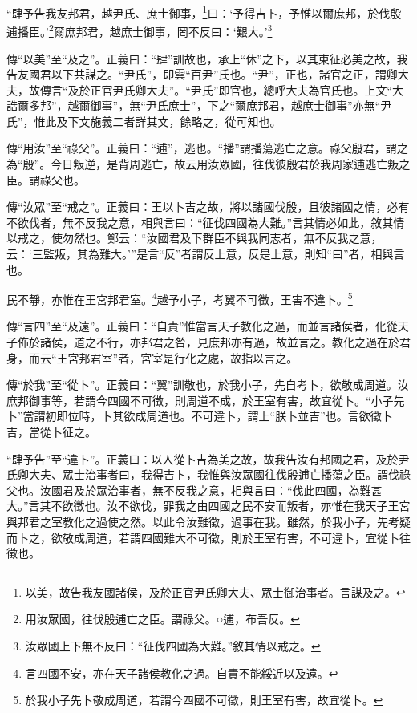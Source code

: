 “肆予告我友邦君，越尹氏、庶士御事，\footnote{以美，故告我友國諸侯，及於正官尹氏卿大夫、眾士御治事者。言謀及之。}曰：‘予得吉卜，予惟以爾庶邦，於伐殷逋播臣。’\footnote{用汝眾國，往伐殷逋亡之臣。謂祿父。○逋，布吾反。}爾庶邦君，越庶士御事，罔不反曰：‘艱大。’\footnote{汝眾國上下無不反曰：“征伐四國為大難。”敘其情以戒之。}


{\noindent\zhuan{}\fzbyks 傳“以美”至“及之”。正義曰：“肆”訓故也，承上“休”之下，以其東征必美之故，我告友國君以下共謀之。“尹氏”，即雲“百尹”氏也。“尹”，正也，諸官之正，謂卿大夫，故傳言“及於正官尹氏卿大夫”。“尹氏”即官也，總呼大夫為官氏也。上文“大誥爾多邦”，越爾御事”，無“尹氏庶士”，下之“爾庶邦君，越庶士御事”亦無“尹氏”，惟此及下文施義二者詳其文，餘略之，從可知也。 \par}

{\noindent\zhuan{}\fzbyks 傳“用汝”至“祿父”。正義曰：“逋”，逃也。“播”謂播蕩逃亡之意。祿父殷君，謂之為“殷”。今日叛逆，是背周逃亡，故云用汝眾國，往伐彼殷君於我周家逋逃亡叛之臣。謂祿父也。 \par}

{\noindent\zhuan{}\fzbyks 傳“汝眾”至“戒之”。正義曰：王以卜吉之故，將以諸國伐殷，且彼諸國之情，必有不欲伐者，無不反我之意，相與言曰：“征伐四國為大難。”言其情必如此，敘其情以戒之，使勿然也。鄭云：“汝國君及下群臣不與我同志者，無不反我之意，云：‘三監叛，其為難大。’”是言“反”者謂反上意，反是上意，則知“曰”者，相與言也。 \par}

民不靜，亦惟在王宮邦君室。\footnote{言四國不安，亦在天子諸侯教化之過。自責不能綏近以及遠。}越予小子，考翼不可徵，王害不違卜。\footnote{於我小子先卜敬成周道，若謂今四國不可徵，則王室有害，故宜從卜。}

{\noindent\zhuan{}\fzbyks 傳“言四”至“及遠”。正義曰：“自責”惟當言天子教化之過，而並言諸侯者，化從天子佈於諸侯，道之不行，亦邦君之咎，見庶邦亦有過，故並言之。教化之過在於君身，而云“王宮邦君室”者，宮室是行化之處，故指以言之。 \par}

{\noindent\zhuan{}\fzbyks 傳“於我”至“從卜”。正義曰：“翼”訓敬也，於我小子，先自考卜，欲敬成周道。汝庶邦御事等，若謂今四國不可徵，則周道不成，於王室有害，故宜從卜。“小子先卜”當謂初即位時，卜其欲成周道也。不可違卜，謂上“朕卜並吉”也。言欲徵卜吉，當從卜征之。 \par}

{\noindent\shu{}\fzkt “肆予告”至“違卜”。正義曰：以人從卜吉為美之故，故我告汝有邦國之君，及於尹氏卿大夫、眾士治事者曰，我得吉卜，我惟與汝眾國往伐殷逋亡播蕩之臣。謂伐祿父也。汝國君及於眾治事者，無不反我之意，相與言曰：“伐此四國，為難甚大。”言其不欲徵也。汝不欲伐，罪我之由四國之民不安而叛者，亦惟在我天子王宮與邦君之室教化之過使之然。以此令汝難徵，過事在我。雖然，於我小子，先考疑而卜之，欲敬成周道，若謂四國難大不可徵，則於王室有害，不可違卜，宜從卜往徵也。 \par}

